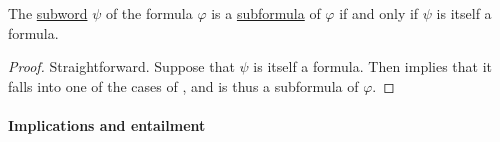 \begin{proposition}\label{thm:propositional_formula_characterization}
  The \hyperref[def:formal_language/subword]{subword} \( \psi \) of the formula \( \varphi \) is a \hyperref[def:propositional_subformula]{subformula} of \( \varphi \) if and only if \( \psi \) is itself a formula.
\end{proposition}
\begin{proof}
  \SufficiencySubProof Straightforward.
  \NecessitySubProof Suppose that \( \psi \) is itself a formula. Then  implies that it falls into one of the cases of , and is thus a subformula of \( \varphi \).
\end{proof}

\paragraph{Implications and entailment}

